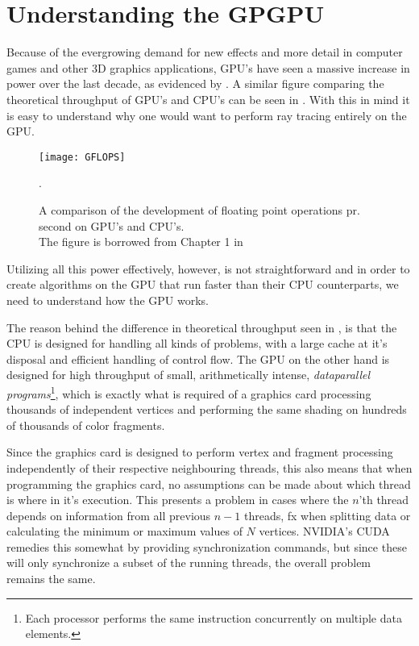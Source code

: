 \chapter{Understanding the GPGPU}\label{chp:GPGPU}





Because of the evergrowing demand for new effects and more detail in
computer games and other 3D graphics applications, GPU's have seen a
massive increase in power over the last decade, as evidenced by
. A similar figure comparing the theoretical
throughput of GPU's and CPU's can be seen in . With
this in mind it is easy to understand why one would want to perform
ray tracing entirely on the GPU.

\begin{figure}
  \centering
  \texttt{[image: GFLOPS]}
  \caption{A comparison of the development of floating point
    operations pr. second on GPU's and CPU's. \\The figure is borrowed
    from Chapter 1 in }.
  \label{fig:gflops}
\end{figure}


Utilizing all this power effectively, however, is not straightforward
and in order to create algorithms on the GPU that run faster than their
CPU counterparts, we need to understand how the GPU works.

The reason behind the difference in theoretical throughput seen in
, is that the CPU is designed for handling all
kinds of problems, with a large cache at it's disposal and efficient
handling of control flow. The GPU on the other hand is designed for
high throughput of small, arithmetically intense, \textit{dataparallel
  programs}\footnote{Each processor performs the same instruction
  concurrently on multiple data elements.}, which is exactly what is
required of a graphics card processing thousands of independent
vertices and performing the same shading on hundreds of thousands of
color fragments.

Since the graphics card is designed to perform vertex and fragment
processing independently of their respective neighbouring threads,
this also means that when programming the graphics card, no
assumptions can be made about which thread is where in it's
execution. This presents a problem in cases where the $n$'th thread
depends on information from all previous $n-1$ threads, fx when
splitting data or calculating the minimum or maximum values of $N$
vertices. NVIDIA's CUDA remedies this somewhat by providing
synchronization commands, but since these will only synchronize a
subset of the running threads, the overall problem remains the same.

